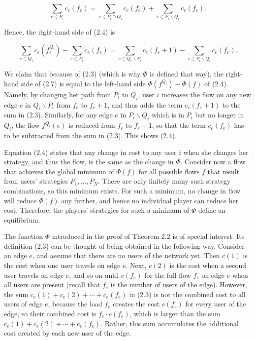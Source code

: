 \documentclass[12pt]{article}
\begin{document}
\begin{equation*}
\sum_{e \in P_{i}} c_{e}\left(f_{e}\right)=\sum_{e \in P_{i} \cap Q_{i}} c_{e}\left(f_{e}\right)+\sum_{e \in P_{i} \backslash Q_{i}} c_{e}\left(f_{e}\right) . \tag{2.6}
\end{equation*}


Hence, the right-hand side of (2.4) is


\begin{equation*}
\sum_{e \in Q_{i}} c_{e}\left(f_{e}^{Q_{i}}\right)-\sum_{e \in P_{i}} c_{e}\left(f_{e}\right)=\sum_{e \in Q_{i} \backslash P_{i}} c_{e}\left(f_{e}+1\right)-\sum_{e \in P_{i} \backslash Q_{i}} c_{e}\left(f_{e}\right) . \tag{2.7}
\end{equation*}


We claim that because of (2.3) (which is why $\Phi$ is defined that way), the right-hand side of (2.7) is equal to the left-hand side $\Phi\left(f^{Q_{i}}\right)-\Phi(f)$ of (2.4). Namely, by changing her path from $P_{i}$ to $Q_{i}$, user $i$ increases the flow on any new edge $e$ in $Q_{i} \backslash P_{i}$ from $f_{e}$ to $f_{e}+1$, and thus adds the term $c_{e}\left(f_{e}+1\right)$ to the sum in (2.3). Similarly, for any edge $e$ in $P_{i} \backslash Q_{i}$ which is in $P_{i}$ but no longer in $Q_{i}$, the flow $f^{Q_{i}}(e)$ is reduced from $f_{e}$ to $f_{e}-1$, so that the term $c_{e}\left(f_{e}\right)$ has to be subtracted from the sum in (2.3). This shows (2.4).

Equation (2.4) states that any change in cost to any user $i$ when she changes her strategy, and thus the flow, is the same as the change in $\Phi$. Consider now a flow that achieves the global minimum of $\Phi(f)$ for all possible flows $f$ that result from users' strategies $P_{1}, \ldots, P_{N}$. There are only finitely many such strategy combinations, so this minimum exists. For such a minimum, no change in flow will reduce $\Phi(f)$ any further, and hence no individual player can reduce her cost. Therefore, the players' strategies for such a minimum of $\Phi$ define an equilibrium.

The function $\Phi$ introduced in the proof of Theorem 2.2 is of special interest. Its definition (2.3) can be thought of being obtained in the following way. Consider an edge $e$, and assume that there are no users of the network yet. Then $c(1)$ is the cost when one user travels on edge $e$. Next, $c(2)$ is the cost when a second user travels on edge $e$, and so on until $c\left(f_{e}\right)$ for the full flow $f_{e}$ on edge $e$ when all users are present (recall that $f_{e}$ is the number of users of the edge). However, the sum $c_{e}(1)+c_{e}(2)+\cdots+c_{e}\left(f_{e}\right)$ in (2.3) is not the combined cost to all users of edge $e$, because the load $f_{e}$ creates the cost $c\left(f_{e}\right)$ for every user of the edge, so their combined cost is $f_{e} \cdot c\left(f_{e}\right)$, which is larger than the sum $c_{e}(1)+c_{e}(2)+\cdots+c_{e}\left(f_{e}\right)$. Rather, this sum accumulates the additional cost created by each new user of the edge.
\end{document}
